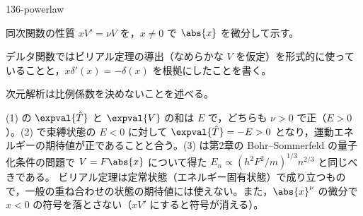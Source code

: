\documentclass[uplatex,dvipdfmx,a4paper,11pt]{jsarticle}
\begin{document}
\begin{kaisetsu}{136-powerlaw}
\begin{ronten}
  \item {} 同次関数の性質 $xV'=\nu V$ を，$x\neq0$ で $\abs{x}$ を微分して示す。
  \item {} デルタ関数ではビリアル定理の導出（なめらかな $V$ を仮定）を形式的に使っていることと，$x\delta'(x)=-\delta(x)$ を根拠にしたことを書く。
  \item {} 次元解析は比例係数を決めないことを述べる。
\end{ronten}
\kenzan (1) の $\expval{\hat{T}}$ と $\expval{V}$ の和は $E$ で，どちらも $\nu>0$ で正（$E>0$）。(2) で束縛状態の $E<0$ に対して $\expval{\hat{T}}=-E>0$ となり，運動エネルギーの期待値が正であることと合う。(3) は第2章の Bohr--Sommerfeld の量子化条件の問題で $V=F\abs{x}$ について得た $E_{n}\propto(h^{2}F^{2}/m)^{1/3}n^{2/3}$ と同じべきである。
\tsumazuki ビリアル定理は定常状態（エネルギー固有状態）で成り立つもので，一般の重ね合わせの状態の期待値には使えない。また，$\abs{x}^{\nu}$ の微分で $x<0$ の符号を落とさない（$xV'$ にすると符号が消える）。
\end{kaisetsu}
\end{document}
